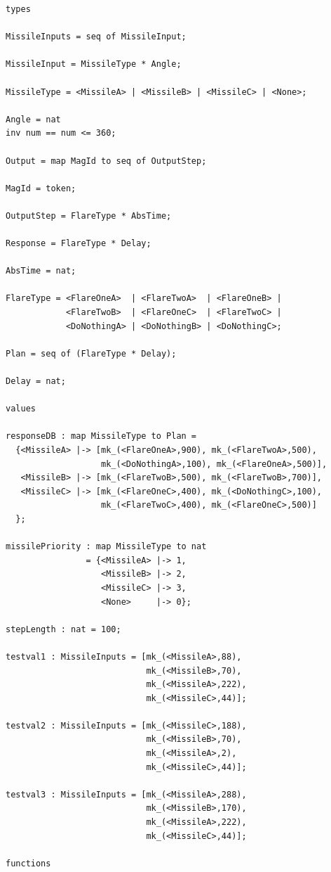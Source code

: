 \documentclass[\pformat,12pt]{jreport}
\begin{document}
\begin{lstlisting}
types

MissileInputs = seq of MissileInput;

MissileInput = MissileType * Angle;

MissileType = <MissileA> | <MissileB> | <MissileC> | <None>;

Angle = nat
inv num == num <= 360;

Output = map MagId to seq of OutputStep;

MagId = token;

OutputStep = FlareType * AbsTime;

Response = FlareType * Delay;

AbsTime = nat;

FlareType = <FlareOneA>  | <FlareTwoA>  | <FlareOneB> |
            <FlareTwoB>  | <FlareOneC>  | <FlareTwoC> |
            <DoNothingA> | <DoNothingB> | <DoNothingC>;

Plan = seq of (FlareType * Delay);

Delay = nat;

values

responseDB : map MissileType to Plan =
  {<MissileA> |-> [mk_(<FlareOneA>,900), mk_(<FlareTwoA>,500),
                   mk_(<DoNothingA>,100), mk_(<FlareOneA>,500)],
   <MissileB> |-> [mk_(<FlareTwoB>,500), mk_(<FlareTwoB>,700)],
   <MissileC> |-> [mk_(<FlareOneC>,400), mk_(<DoNothingC>,100),
                   mk_(<FlareTwoC>,400), mk_(<FlareOneC>,500)]
  };

missilePriority : map MissileType to nat
                = {<MissileA> |-> 1,
                   <MissileB> |-> 2,
                   <MissileC> |-> 3,
                   <None>     |-> 0};

stepLength : nat = 100;

testval1 : MissileInputs = [mk_(<MissileA>,88),
                            mk_(<MissileB>,70),
                            mk_(<MissileA>,222),
                            mk_(<MissileC>,44)];

testval2 : MissileInputs = [mk_(<MissileC>,188),
                            mk_(<MissileB>,70),
                            mk_(<MissileA>,2),
                            mk_(<MissileC>,44)];

testval3 : MissileInputs = [mk_(<MissileA>,288),
                            mk_(<MissileB>,170),
                            mk_(<MissileA>,222),
                            mk_(<MissileC>,44)];

functions


\end{lstlisting}
\end{document}
